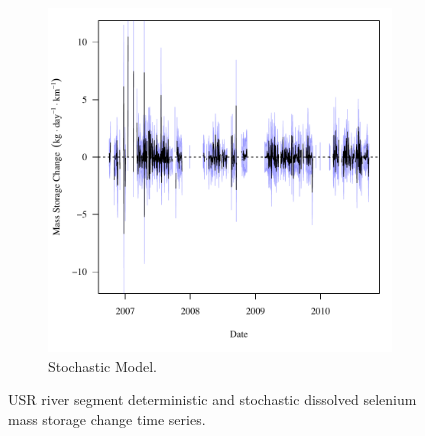 \begin{landscape}
\begin{figure}
\begin{subfigure}{0.7\textwidth}
			\includegraphics[width=\tableCustomSize]{"Figures/Results_USR/Stochastic/f Segment C"}
			\caption{Stochastic Model.}
		\end{subfigure}
		\caption{USR river segment deterministic and stochastic dissolved selenium mass storage change time series.}
	\end{figure}
\end{landscape}


